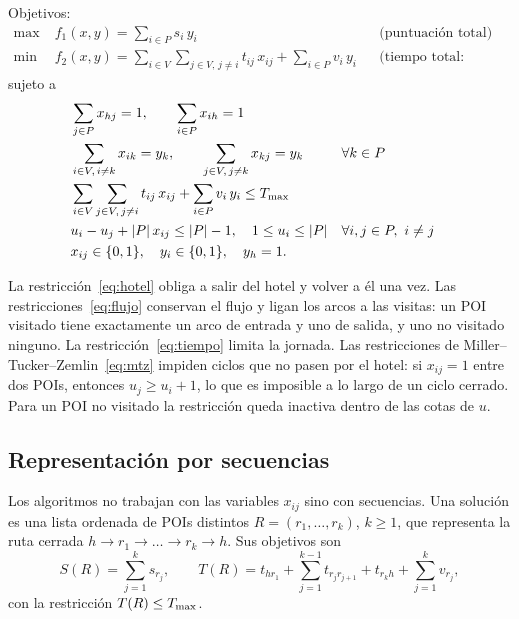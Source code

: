 Objetivos:
\begin{align}
  \max\;& f_1(x,y) = \sum_{i \in P} s_i\, y_i && \text{(puntuación total)} \label{eq:f1}\\
  \min\;& f_2(x,y) = \sum_{i \in V} \sum_{j \in V,\, j \ne i} t_{ij}\, x_{ij} + \sum_{i \in P} v_i\, y_i && \text{(tiempo total: conducción y visitas)} \label{eq:f2}
\end{align}
sujeto a
\begin{align}
  & \sum_{j \in P} x_{hj} = 1, \qquad \sum_{i \in P} x_{ih} = 1 \label{eq:hotel}\\
  & \sum_{i \in V,\, i \ne k} x_{ik} = y_k, \qquad \sum_{j \in V,\, j \ne k} x_{kj} = y_k && \forall k \in P \label{eq:flujo}\\
  & \sum_{i \in V} \sum_{j \in V,\, j \ne i} t_{ij}\, x_{ij} + \sum_{i \in P} v_i\, y_i \le T_{\max} \label{eq:tiempo}\\
  & u_i - u_j + |P|\, x_{ij} \le |P| - 1, \quad 1 \le u_i \le |P| && \forall i,j \in P,\ i \ne j \label{eq:mtz}\\
  & x_{ij} \in \{0,1\}, \quad y_i \in \{0,1\}, \quad y_h = 1. \label{eq:dominio}
\end{align}

La restricción~\eqref{eq:hotel} obliga a salir del hotel y volver a él una vez. Las restricciones~\eqref{eq:flujo} conservan el flujo y ligan los arcos a las visitas: un POI visitado tiene exactamente un arco de entrada y uno de salida, y uno no visitado ninguno. La restricción~\eqref{eq:tiempo} limita la jornada. Las restricciones de Miller--Tucker--Zemlin~\eqref{eq:mtz} \citep{mtz1960} impiden ciclos que no pasen por el hotel: si $x_{ij} = 1$ entre dos POIs, entonces $u_j \ge u_i + 1$, lo que es imposible a lo largo de un ciclo cerrado. Para un POI no visitado la restricción queda inactiva dentro de las cotas de $u$.

\subsection{Representación por secuencias}
\label{sec:secuencias}

Los algoritmos no trabajan con las variables $x_{ij}$ sino con secuencias. Una solución es una lista ordenada de POIs distintos $R = (r_1,\dots,r_k)$, $k \ge 1$, que representa la ruta cerrada $h \to r_1 \to \dots \to r_k \to h$. Sus objetivos son
\begin{equation}
  S(R) = \sum_{j=1}^{k} s_{r_j}, \qquad
  T(R) = t_{h r_1} + \sum_{j=1}^{k-1} t_{r_j r_{j+1}} + t_{r_k h} + \sum_{j=1}^{k} v_{r_j},
  \label{eq:secuencia}
\end{equation}
con la restricción $T(R) \le T_{\max}$.

